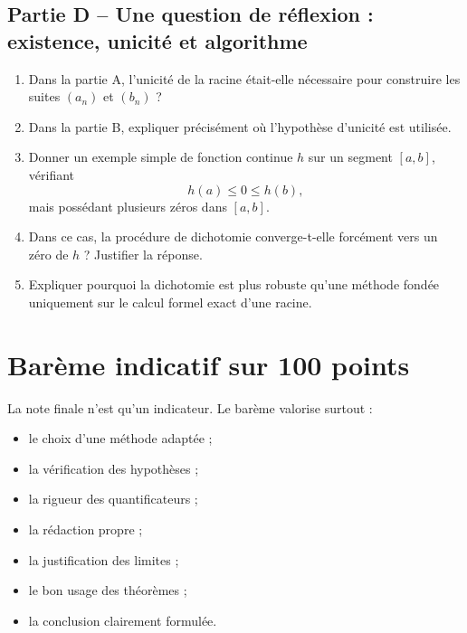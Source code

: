 \documentclass[11pt,a4paper]{article}
\begin{document}
\subsection*{Partie D -- Une question de réflexion : existence, unicité et algorithme}

\begin{enumerate}[resume]
    \item Dans la partie A, l'unicité de la racine était-elle nécessaire pour construire les suites \((a_n)\) et \((b_n)\) ?

    \item Dans la partie B, expliquer précisément où l'hypothèse d'unicité est utilisée.

    \item Donner un exemple simple de fonction continue \(h\) sur un segment \([a,b]\), vérifiant
    \[
    h(a)\leq 0\leq h(b),
    \]
    mais possédant plusieurs zéros dans \([a,b]\).

    \item Dans ce cas, la procédure de dichotomie converge-t-elle forcément vers un zéro de \(h\) ? Justifier la réponse.

    \item Expliquer pourquoi la dichotomie est plus robuste qu'une méthode fondée uniquement sur le calcul formel exact d'une racine.
\end{enumerate}

\newpage


\section*{Barème indicatif sur 100 points}

\begin{baremebox}
La note finale n'est qu'un indicateur. Le barème valorise surtout :
\begin{itemize}
    \item le choix d'une méthode adaptée ;
    \item la vérification des hypothèses ;
    \item la rigueur des quantificateurs ;
    \item la rédaction propre ;
    \item la justification des limites ;
    \item le bon usage des théorèmes ;
    \item la conclusion clairement formulée.
\end{itemize}
\end{baremebox}
\end{document}
